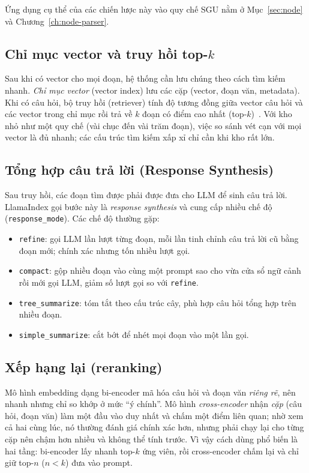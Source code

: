 Ứng dụng cụ thể của các chiến lược này vào quy chế SGU nằm ở Mục~\ref{sec:node} và Chương~\ref{ch:node-parser}.

\subsection{Chỉ mục vector và truy hồi top-\texorpdfstring{$k$}{k}}

Sau khi có vector cho mọi đoạn, hệ thống cần lưu chúng theo cách tìm kiếm nhanh. \emph{Chỉ mục vector} (vector index) lưu các cặp (vector, đoạn văn, metadata). Khi có câu hỏi, bộ truy hồi (retriever) tính độ tương đồng giữa vector câu hỏi và các vector trong chỉ mục rồi trả về $k$ đoạn có điểm cao nhất (top-$k$)~\cite{karpukhin2020dpr}. Với kho nhỏ như một quy chế (vài chục đến vài trăm đoạn), việc so sánh vét cạn với mọi vector là đủ nhanh; các cấu trúc tìm kiếm xấp xỉ chỉ cần khi kho rất lớn.


\subsection{Tổng hợp câu trả lời (Response Synthesis)}

Sau truy hồi, các đoạn tìm được phải được đưa cho LLM để sinh câu trả lời. LlamaIndex gọi bước này là \emph{response synthesis} và cung cấp nhiều chế độ (\texttt{response\_mode}). Các chế độ thường gặp:

\begin{itemize}
  \item \texttt{refine}: gọi LLM lần lượt từng đoạn, mỗi lần tinh chỉnh câu trả lời cũ bằng đoạn mới; chính xác nhưng tốn nhiều lượt gọi.
  \item \texttt{compact}: gộp nhiều đoạn vào cùng một prompt sao cho vừa cửa sổ ngữ cảnh rồi mới gọi LLM, giảm số lượt gọi so với \texttt{refine}.
  \item \texttt{tree\_summarize}: tóm tắt theo cấu trúc cây, phù hợp câu hỏi tổng hợp trên nhiều đoạn.
  \item \texttt{simple\_summarize}: cắt bớt để nhét mọi đoạn vào một lần gọi.
\end{itemize}

\subsection{Xếp hạng lại (reranking)}

Mô hình embedding dạng bi-encoder mã hóa câu hỏi và đoạn văn \emph{riêng rẽ}, nên nhanh nhưng chỉ so khớp ở mức ``ý chính''. Mô hình \emph{cross-encoder} nhận \emph{cặp} (câu hỏi, đoạn văn) làm một đầu vào duy nhất và chấm một điểm liên quan; nhờ xem cả hai cùng lúc, nó thường đánh giá chính xác hơn, nhưng phải chạy lại cho từng cặp nên chậm hơn nhiều và không thể tính trước. Vì vậy cách dùng phổ biến là hai tầng: bi-encoder lấy nhanh top-$k$ ứng viên, rồi cross-encoder chấm lại và chỉ giữ top-$n$ ($n<k$) đưa vào prompt.

